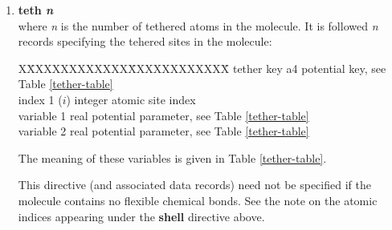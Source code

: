 \begin{enumerate}
\item{\bf teth {\em n}} \\
where {\em n} is the number of tethered atoms in the molecule.  It
is followed {\em n} records specifying the tehered sites in the
molecule:
\begin{tabbing}
X\=XXXXXXXXXXXX\=XXXXXXXXXXXX\=\kill
\> tether key    \> a4      \> potential key, see Table \ref{tether-table} \\
\> index 1 ($i$) \> integer \> atomic site index \\
\> variable 1    \> real    \> potential parameter, see Table \ref{tether-table} \\
\> variable 2    \> real    \> potential parameter, see Table \ref{tether-table}
\end{tabbing}
The meaning of these variables is given in Table
\ref{tether-table}.

This directive (and associated data records) need not be specified
if the molecule contains no flexible chemical bonds.  See the note
on the atomic indices appearing under the {\bf shell} directive
above.

\begin{table}[htbp]
\end{table}


\end{enumerate}
